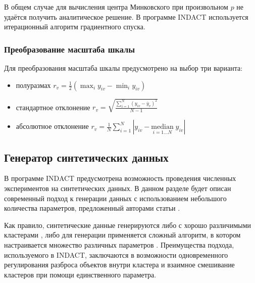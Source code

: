 \documentclass[12pt]{diploma}
\begin{document}
		В общем случае для вычисления центра Минковского при произвольном $ p $ не удаётся получить аналитическое решение. В программе INDACT используется итерационный алгоритм градиентного спуска.
	
		\subsubsection{Преобразование масштаба  шкалы}
		Для преобразования масштаба шкалы предусмотрено на выбор три варианта:
		\begin{itemize}
			\item полуразмах $\displaystyle r_v = \frac{1}{2}(\max_{i} y_{iv}- \min_{i}y_{iv}) $
			\item стандартное отклонение $ r_v = \sqrt{\frac{\sum_{i=1}^{N} (y_{iv}-\overline{y}_v)^2}{N-1}} $
			\item абсолютное отклонение $ r_v = \frac{1}{N}\sum_{i=1}^{N} | y_{iv} -  \underset{i=1\ldots N}{\mathrm{median}}\;y_{iv} | $
		\end{itemize}
	
	\subsection{Генератор синтетических данных}
	В программе INDACT предусмотрена возможность проведения численных экспериментов на синтетических данных. В данном разделе будет описан современный подход к генерации данных с использованием небольшого количества параметров, предложенный авторами статьи \cite{kovaleva}.
	
	Как правило, синтетические данные генерируются либо с хорошо различимыми кластерами \cite{data-gen1}, либо для генерации применяется сложный алгоритм, в котором настраивается множество различных параметров \cite{data-gen2}. Преимущества подхода, используемого в INDACT, заключаются в возможности одновременного регулирования разброса объектов внутри кластера и взаимное смешивание кластеров при помощи единственного параметра. 
	
\end{document}
